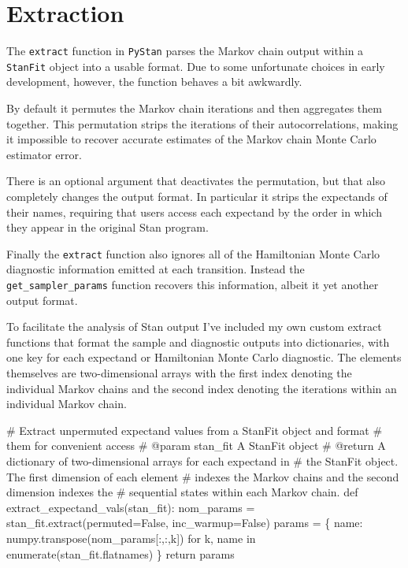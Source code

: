 \documentclass[
  letterpaper,
  DIV=11,
  numbers=noendperiod]{scrartcl}
\newenvironment{Shaded}{\begin{snugshade}}{\end{snugshade}}
\newcommand{\BuiltInTok}[1]{\textcolor[rgb]{0.00,0.23,0.31}{#1}}
\newcommand{\CommentTok}[1]{\textcolor[rgb]{0.37,0.37,0.37}{#1}}
\newcommand{\ControlFlowTok}[1]{\textcolor[rgb]{0.00,0.23,0.31}{#1}}
\newcommand{\KeywordTok}[1]{\textcolor[rgb]{0.00,0.23,0.31}{#1}}
\newcommand{\NormalTok}[1]{\textcolor[rgb]{0.00,0.23,0.31}{#1}}
\newcommand{\OperatorTok}[1]{\textcolor[rgb]{0.37,0.37,0.37}{#1}}
\newcommand{\VariableTok}[1]{\textcolor[rgb]{0.07,0.07,0.07}{#1}}
\begin{document}
\section{Extraction}\label{extraction}

The \texttt{extract} function in \texttt{PyStan} parses the Markov chain
output within a \texttt{StanFit} object into a usable format. Due to
some unfortunate choices in early development, however, the function
behaves a bit awkwardly.

By default it permutes the Markov chain iterations and then aggregates
them together. This permutation strips the iterations of their
autocorrelations, making it impossible to recover accurate estimates of
the Markov chain Monte Carlo estimator error.

There is an optional argument that deactivates the permutation, but that
also completely changes the output format. In particular it strips the
expectands of their names, requiring that users access each expectand by
the order in which they appear in the original Stan program.

Finally the \texttt{extract} function also ignores all of the
Hamiltonian Monte Carlo diagnostic information emitted at each
transition. Instead the \texttt{get\_sampler\_params} function recovers
this information, albeit it yet another output format.

To facilitate the analysis of Stan output I've included my own custom
extract functions that format the sample and diagnostic outputs into
dictionaries, with one key for each expectand or Hamiltonian Monte Carlo
diagnostic. The elements themselves are two-dimensional arrays with the
first index denoting the individual Markov chains and the second index
denoting the iterations within an individual Markov chain.

\begin{Shaded}
\begin{Highlighting}[]
\CommentTok{\# Extract unpermuted expectand values from a StanFit object and format }
\CommentTok{\# them for convenient access}
\CommentTok{\# @param stan\_fit A StanFit object}
\CommentTok{\# @return A dictionary of two{-}dimensional arrays for each expectand in }
\CommentTok{\#         the StanFit object.  The first dimension of each element }
\CommentTok{\#         indexes the Markov chains and the second dimension indexes the }
\CommentTok{\#         sequential states within each Markov chain. }
\KeywordTok{def}\NormalTok{ extract\_expectand\_vals(stan\_fit):}
\NormalTok{  nom\_params }\OperatorTok{=}\NormalTok{ stan\_fit.extract(permuted}\OperatorTok{=}\VariableTok{False}\NormalTok{, inc\_warmup}\OperatorTok{=}\VariableTok{False}\NormalTok{)}
\NormalTok{  params }\OperatorTok{=}\NormalTok{ \{ name: numpy.transpose(nom\_params[:,:,k]) }
             \ControlFlowTok{for}\NormalTok{ k, name }\KeywordTok{in} \BuiltInTok{enumerate}\NormalTok{(stan\_fit.flatnames) \}}
  \ControlFlowTok{return}\NormalTok{ params}
\end{Highlighting}
\end{Shaded}
\end{document}
